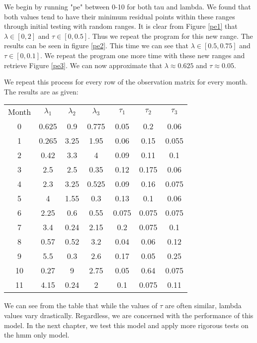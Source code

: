     We begin by running "pe" between 0-10 for both tau and lambda. We found that both values tend to have their minimum residual points within these ranges through initial testing with random ranges. It is clear from Figure \ref{pe1} that $\lambda \in [0,2]$ and $\tau \in [0,0.5]$. Thus we repeat the program for this new range. The results can be seen in figure \ref{pe2}. This time we can see that $\lambda \in [0.5,0.75]$ and $\tau \in [0,0.1]$. We repeat the program one more time with these new ranges and retrieve Figure \ref{pe3}. We can now approximate that $\lambda \approx 0.625$ and $\tau \approx 0.05$. 

    We repeat this process for every row of the observation matrix for every month. The results are as given:

    \begin{center}
        \begin{tabular}{c c c c c c c}
            \label{petable}
            Month   &   $\lambda_1$ &   $\lambda_2$ &   $\lambda_3$ &   $\tau_1$    &   $\tau_2$    &   $\tau_3$   \\
                0   &   0.625       &   0.9         &   0.775       &   0.05    &   0.2     &   0.06    \\
                1   &   0.265       &   3.25        &   1.95        &   0.06    &   0.15    &   0.055   \\
                2   &   0.42        &   3.3         &   4           &   0.09    &   0.11    &   0.1     \\
                3   &   2.5         &   2.5         &   0.35        &   0.12    &   0.175   &   0.06    \\
                4   &   2.3         &   3.25        &   0.525       &   0.09    &   0.16    &   0.075   \\
                5   &   4           &   1.55        &   0.3         &   0.13    &   0.1     &   0.06    \\
                6   &   2.25        &   0.6         &   0.55        &   0.075   &   0.075   &   0.075   \\
                7   &   3.4         &   0.24        &   2.15        &   0.2     &   0.075   &   0.1     \\
                8   &   0.57        &   0.52        &   3.2         &   0.04    &   0.06    &   0.12    \\
                9   &   5.5         &   0.3         &   2.6         &   0.17    &   0.05    &   0.25    \\
                10  &   0.27        &   9           &   2.75        &   0.05    &   0.64    &   0.075   \\
                11  &   4.15        &   0.24        &   2           &   0.1     &   0.075   &   0.11    

        \end{tabular}
    \end{center}

    We can see from the table that while the values of $\tau$ are often similar, lambda values vary drastically. Regardless, we are concerned with the performance of this model. In the next chapter, we test this model and apply more rigorous tests on the hmm only model.




